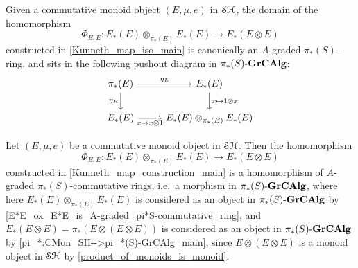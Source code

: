 \documentclass[../main.tex]{subfiles}
\begin{document}
\begin{corollary}\label{E*E_ox_E*E_is_A-graded_pi*S-commutative_ring}
    Given a %
	commutative monoid object $(E,\mu,e)$ in $\mathcal{SH}$, the domain of the %
	homomorphism
    \[\Phi_{E,E}:E_*(E)\otimes_{\pi_*(E)}E_*(E)\to E_*(E\otimes E)\]
    constructed in \autoref{Kunneth_map_iso_main} is canonically an $A$-graded $\pi_*(S)$-ring, and sits in the following pushout diagram in ${\pi_*(S)}\text-\mathbf{GrCAlg}$:
    \[\begin{tikzcd}
        {\pi_*(E)} & {E_*(E)} \\
        {E_*(E)} & {E_*(E)\otimes_{\pi_*(E)}E_*(E)}
        \arrow["{\eta_L}", from=1-1, to=1-2]
        \arrow["{\eta_R}"', from=1-1, to=2-1]
        \arrow["{x\mapsto x\otimes 1}"', from=2-1, to=2-2]
        \arrow["{x\mapsto1\otimes x}", from=1-2, to=2-2]
    \end{tikzcd}\]
\end{corollary}

\begin{lemma}\label{Phi_E_is_homo_of_A-graded_pi_*S-commutative_rings_main}
    Let $(E,\mu,e)$ be a commutative monoid object in $\mathcal{SH}$. Then the homomorphism
    \[\Phi_{E,E}:E_*(E)\otimes_{\pi_*(E)}E_*(E)\to E_*(E\otimes E)\]
    constructed in \autoref{Kunneth_map_construction_main} is a homomorphism of $A$-graded $\pi_*(S)$-commutative rings, i.e.\ a morphism in ${\pi_*(S)}\text-\mathbf{GrCAlg}$, where here $E_*(E)\otimes_{\pi_*(E)}E_*(E)$ is considered as an object in ${\pi_*(S)}\text-\mathbf{GrCAlg}$ by \autoref{E*E_ox_E*E_is_A-graded_pi*S-commutative_ring}, and $E_*(E\otimes E)=\pi_*(E\otimes (E\otimes E))$ is considered as an object in ${\pi_*(S)}\text-\mathbf{GrCAlg}$ by \autoref{pi_*:CMon_SH-->pi_*(S)-GrCAlg_main}, since $E\otimes(E\otimes E)$ is a monoid object in $\mathcal{SH}$ by \autoref{product_of_monoids_is_monoid}.
\end{lemma}
\end{document}
